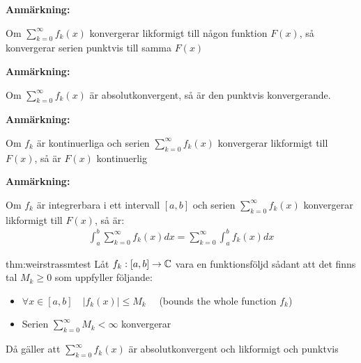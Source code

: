 \par\bigskip
\noindent\textbf{Anmärkning:}\par
\noindent Om $\sum_{k=0}^{\infty}f_k(x)$ konvergerar likformigt till någon funktion $F(x)$, så konvergerar serien punktvis till samma $F(x)$ 
\par\bigskip
\noindent\textbf{Anmärkning:}\par
\noindent Om $\sum_{k=0}^{\infty}f_k(x)$ är absolutkonvergent, så är den punktvis konvergerande. 
\par\bigskip
\noindent\textbf{Anmärkning:}\par
\noindent Om $f_k$ är kontinuerliga och serien $\sum_{k=0}^{\infty}f_k(x)$ konvergerar likformigt till $F(x)$, så är $F(x)$ kontinuerlig
\par\bigskip
\noindent\textbf{Anmärkning:}\par
\noindent Om $f_k$ är integrerbara i ett intervall $[a,b]$ och serien $\sum_{k=0}^{\infty}f_k(x) $  konvergerar likformigt till $F(x)$, så är:
\begin{equation*}
  \begin{gathered}
    \int_{a}^{b}\sum_{k=0}^{\infty}f_k(x)dx = \sum_{k=0}^{\infty}\int_{a}^{b}f_k(x)dx
  \end{gathered}
\end{equation*}
\par\bigskip
\begin{theo}{thm:weirstrassmtest}
  Låt $f_k:[a,b]\to\mathbb{C}$ vara en funktionsföljd sådant att det finns tal $M_k\geq0$ som uppfyller följande:\par
  \begin{itemize}
    \item $\forall x\in[a,b]\quad \left|f_k(x)\right|\leq M_k\quad$ (bounds the whole function $f_k$)
      \par\bigskip
    \item Serien $\sum_{k=0}^{\infty}M_k<\infty$ konvergerar
  \end{itemize}
  \par\bigskip
  \noindent Då gäller att $\sum_{k=0}^{\infty}f_k(x)$ är absolutkonvergent och likformigt och punktvis 
\end{theo}
